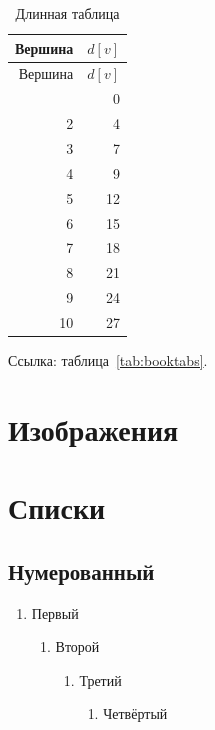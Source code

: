 \documentclass[font=modern]{cmcmsuthesis-master}
\begin{document}
\begin{longtable}{@{}rr@{}}\caption{Длинная таблица}\label{tab:long}\\
\toprule Вершина&$d[v]$\\\midrule\endfirsthead
\toprule Вершина&$d[v]$\\\midrule\endhead\bottomrule\endfoot
1&0\\2&4\\3&7\\4&9\\5&12\\6&15\\7&18\\8&21\\9&24\\10&27\\\end{longtable}

Ссылка: таблица~\ref{tab:booktabs}.

\section{Изображения}

\section{Списки}
\subsection{Нумерованный}
\begin{enumerate}\item Первый\begin{enumerate}\item Второй\begin{enumerate}\item Третий\begin{enumerate}\item Четвёртый\end{enumerate}\end{enumerate}\end{enumerate}\end{enumerate}
\end{document}
